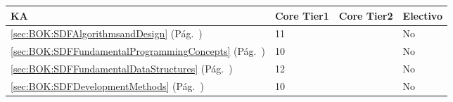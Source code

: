 \begin{center}
\begin{tabularx}{\textwidth}{|X|p{1cm}|p{1cm}|p{1.4cm}|}\hline
\textbf{\acf{KA}} & \textbf{Core Tier1} & \textbf{Core Tier2} & \textbf{Electivo} \\ \hline
\ref{sec:BOK:SDFAlgorithmsandDesign} \htmlref{\SDFAlgorithmsandDesign}{sec:BOK:SDFAlgorithmsandDesign}\xspace (Pág.~\pageref{sec:BOK:SDFAlgorithmsandDesign}) & 11 & ~ & No \\ \hline
\ref{sec:BOK:SDFFundamentalProgrammingConcepts} \htmlref{\SDFFundamentalProgrammingConcepts}{sec:BOK:SDFFundamentalProgrammingConcepts}\xspace (Pág.~\pageref{sec:BOK:SDFFundamentalProgrammingConcepts}) & 10 & ~ & No \\ \hline
\ref{sec:BOK:SDFFundamentalDataStructures} \htmlref{\SDFFundamentalDataStructures}{sec:BOK:SDFFundamentalDataStructures}\xspace (Pág.~\pageref{sec:BOK:SDFFundamentalDataStructures}) & 12 & ~ & No \\ \hline
\ref{sec:BOK:SDFDevelopmentMethods} \htmlref{\SDFDevelopmentMethods}{sec:BOK:SDFDevelopmentMethods}\xspace (Pág.~\pageref{sec:BOK:SDFDevelopmentMethods}) & 10 & ~ & No \\ \hline
\end{tabularx}
\end{center}
